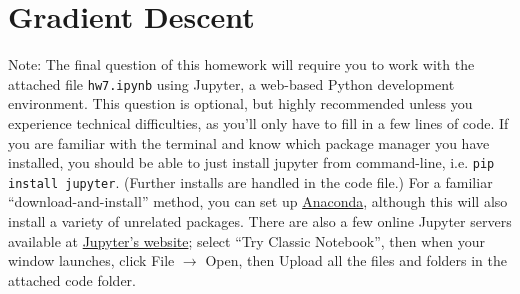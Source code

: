 \documentclass{article}
\begin{document}
\section{Gradient Descent}
Note: The final question of this homework will require you to work with the attached file \verb|hw7.ipynb| using Jupyter, a web-based Python development environment. This question is optional, but highly recommended unless you experience technical difficulties, as you'll only have to fill in a few lines of code. If you are familiar with the terminal and know which package manager you have installed, you should be able to just install jupyter from command-line, i.e. \verb|pip install jupyter|. (Further installs are handled in the code file.) For a familiar ``download-and-install'' method, you can set up \href{https://www.anaconda.com/products/individual#download-section}{{\color{blue} Anaconda}}, although this will also install a variety of unrelated packages. There are also a few online Jupyter servers available at \href{https://jupyter.org/try}{{\color{blue} Jupyter's website}}; select ``Try Classic Notebook'', then when your window launches, click File $\rightarrow$ Open, then Upload all the files and folders in the attached code folder.  \\\\
\end{document}
